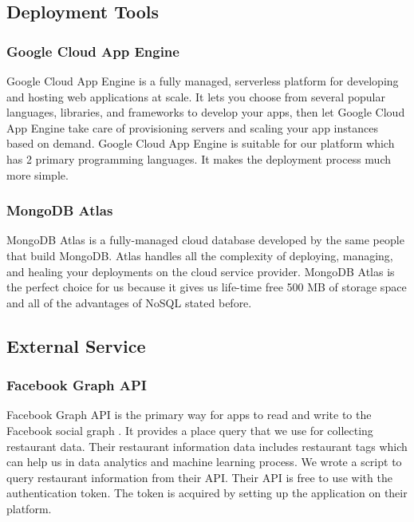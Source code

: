 \documentclass[12pt,oneside,openright,a4paper]{cpe-english-project}
\begin{document}
\subsection{Deployment Tools}

\subsubsection{Google Cloud App Engine}

Google Cloud App Engine is a fully managed, serverless platform for developing and hosting web applications at scale. It lets you choose from several popular languages, libraries, and frameworks to develop your apps, then let Google Cloud App Engine take care of provisioning servers and scaling your app instances based on demand. \cite{GoogleAppEngineDocumentation} Google Cloud App Engine is suitable for our platform which has 2 primary programming languages. It makes the deployment process much more simple.

\subsubsection{MongoDB Atlas}

MongoDB Atlas is a fully-managed cloud database developed by the same people that build MongoDB. Atlas handles all the complexity of deploying, managing, and healing your deployments on the cloud service provider. \cite{MongoDBAtlas} MongoDB Atlas is the perfect choice for us because it gives us life-time free 500 MB of storage space and all of the advantages of NoSQL stated before.


\subsection{External Service}

\subsubsection{Facebook Graph API}

Facebook Graph API is the primary way for apps to read and write to the Facebook social graph \cite{GraphAPI}. It provides a place query that we use for collecting restaurant data. Their restaurant information data includes restaurant tags which can help us in data analytics and machine learning process. We wrote a script to query restaurant information from their API. Their API is free to use with the authentication token. The token is acquired by setting up the application on their platform.
\end{document}
